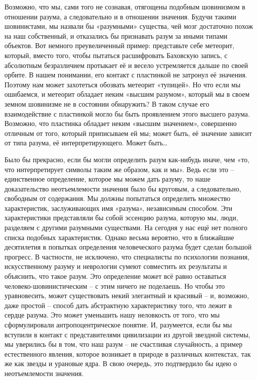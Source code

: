\documentclass[../main.tex]{subfiles}
\begin{document}
Возможно, что мы, сами того не сознавая, отягощены подобным шовинизмом в отношении разума, а следовательно и в отношении значения. Будучи такими шовинистами, мы назвали бы «разумными» существа, чей мозг достаточно похож на наш собственный, и отказались бы признавать разум за иными типами объектов. Вот немного преувеличенный пример: представьте себе метеорит, который, вместо того, чтобы пытаться расшифровать Баховскую запись, с абсолютным безразличием протыкает её и весело устремляется дальше по своей орбите. В нашем понимании, его контакт с пластинкой не затронул её значения. Поэтому нам может захотеться обозвать метеорит «тупицей». Но что если мы ошибаемся, и метеорит обладает неким «высшим разумом», который мы в своем земном шовинизме не в состоянии обнаружить? В таком случае его взаимодействие с пластинкой могло бы быть проявлением этого высшего разума. Возможно, что пластинка обладает неким «высшим значением», совершенно отличным от того, который приписываем ей мы; может быть, её значение зависит от типа разума, её интерпретирующего. Может быть\ldots{}

Было бы прекрасно, если бы могли определить разум как-нибудь иначе, чем «то, что интерпретирует символы таким же образом, как и мы». Ведь если это \--- единственное определение, которое мы можем дать разуму, то наше доказательство неотъемлемости значения было бы круговым, а следовательно, свободным от содержания. Мы должны попытаться определить множество характеристик, заслуживающих имя «разума», независимым способом. Эти характеристики представляли бы собой эссенцию разума, которую мы, люди, разделяем с другими разумными существами. На сегодня у нас ещё нет полного списка подобных характеристик. Однако весьма вероятно, что в ближайшие десятилетия в попытках определения человеческого разума будет сделан большой прогресс. В частности, не исключено, что специалисты по психологии познания, искусственному разуму и неврологии сумеют совместить их результаты и объяснить, что такое разум. Это определение может всё равно оставаться человеко-шовинистическим \--- с этим ничего не поделаешь. Но чтобы это уравновесить, может существовать некий элегантный и красивый \--- и, возможно, даже простой \--- способ дать абстрактную характеристику того, что лежит в сердце разума. Это может уменьшить нашу неловкость от того, что мы сформулировали антропоцентрическое понятие. И, разумеется, если бы мы вступили в контакт с представителями цивилизации из другой звездной системы, мы уверились бы в том, что наш разум \--- не счастливая случайность, а пример естественного явления, которое возникает в природе в различных контекстах, так же как звезды и урановые ядра. В свою очередь, это подтвердило бы идею о неотъемлемости значения.
\end{document}
